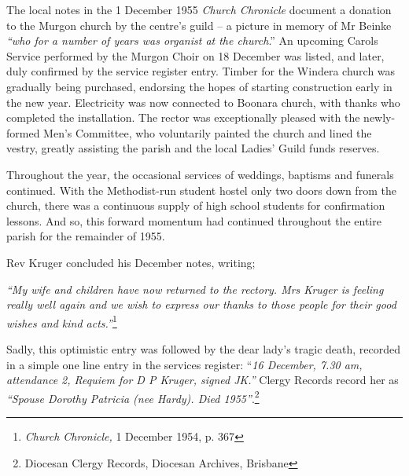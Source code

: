 The local notes in the 1 December 1955 \emph{Church Chronicle} document a donation to the Murgon church by the centre's guild -- a picture in memory of Mr Beinke \emph{``who for a number of years was organist at the church}.'' An upcoming Carols Service performed by the Murgon Choir on 18 December was listed, and later, duly confirmed by the service register entry. Timber for the Windera church was gradually being purchased, endorsing the hopes of starting construction early in the new year. Electricity was now connected to Boonara church, with thanks who completed the installation. The rector was exceptionally pleased with the newly-formed Men's Committee, who voluntarily painted the church and lined the vestry, greatly assisting the parish and the local Ladies' Guild funds reserves.



Throughout the year, the occasional services of weddings, baptisms and funerals continued. With the Methodist-run student hostel only two doors down from the church, there was a continuous supply of high school students for confirmation lessons. And so, this forward momentum had continued throughout the entire parish for the remainder of 1955.



Rev Kruger concluded his December notes, writing;



\emph{``My wife and children have now returned to the rectory. Mrs Kruger is feeling really well again and we wish to express our thanks to those people for their good wishes and kind acts.''}\footnote{\emph{Church Chronicle,} 1 December 1954, p. 367}


\smallskip


Sadly, this optimistic entry was followed by the dear lady's tragic death, recorded in a simple one line entry in the services register: ``\emph{16 December, 7.30 am, attendance 2, Requiem for D P Kruger, signed JK.''} Clergy Records record her as \emph{``Spouse Dorothy Patricia (nee Hardy). Died 1955''}.\footnote{Diocesan Clergy Records, Diocesan Archives, Brisbane}


\smallskip



